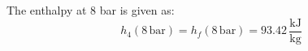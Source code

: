 The enthalpy at 8 bar is given as:  
\[
h_4(8 \, \text{bar}) = h_f(8 \, \text{bar}) = 93.42 \, \frac{\text{kJ}}{\text{kg}}
\]